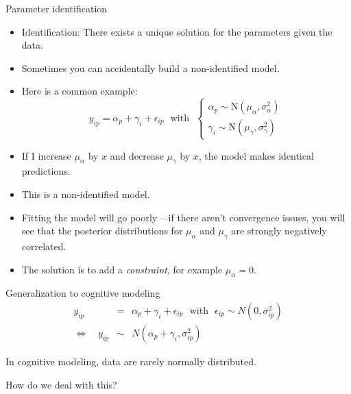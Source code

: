 \documentclass[aspectratio=169]{beamer}
\begin{document}
\begin{frame}[fragile]{Parameter identification}
    \begin{itemize}
        \item Identification: There exists a unique solution for the parameters given the data.\pause
        \item Sometimes you can accidentally build a non-identified model.\pause
        \item Here is a common example:
        $$
            y_{ip} = \alpha_{p} + \gamma_{i} + \epsilon_{ip} \text{ ~with~ } \begin{cases}
                \alpha_{p} \sim \text{N}(\mu_{\alpha}, \sigma^2_{\alpha}) \\
                \gamma_{i} \sim \text{N}(\mu_{\gamma}, \sigma^2_{\gamma})
            \end{cases}
        $$
        \item If I increase $\mu_{\alpha}$ by $x$ and decrease $\mu_{\gamma}$ by $x$, the model makes identical predictions.
        \item This is a non-identified model.\pause
        \item Fitting the model will go poorly -- if there aren't convergence issues, you will see that the posterior distributions for $\mu_{\alpha}$ and $\mu_{\gamma}$ are strongly negatively correlated.\pause
        \item The solution is to add a \emph{constraint}, for example $\mu_{\alpha} = 0$.
    \end{itemize}
\end{frame}

\begin{frame}[fragile]{Generalization to cognitive modeling}
    \begin{eqnarray*}
        y_{ip} &=& \alpha_{p} + \gamma_{i} + \epsilon_{ip} \text{ ~with~ } \epsilon_{ip} \sim {N}(0, \sigma^2_{ip})\\
        \Leftrightarrow \quad
        y_{ip} &\sim& {N}(\alpha_{p} + \gamma_{i}, \sigma^2_{ip})
    \end{eqnarray*}

    In cognitive modeling, data are rarely normally distributed.
    
    How do we deal with this?
\end{frame}
\end{document}
